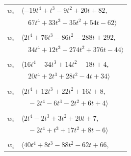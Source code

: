 \documentclass[11pt]{article}
\begin{document}
\begin{longtable}{@{}ll@{}}
$w_i$ & $\langle -19t^{4}+t^{3}-9t^{2}+20t+82,$\\
 & $\quad 67t^{4}+33t^{3}+35t^{2}+54t-62\rangle$\\
\addlinespace[2pt]
\multicolumn{2}{@{}p{0.97\textwidth}@{}}{$i=72$, $D_i=1$, $\rho_{ij}$: $5{:}1, \allowbreak 9{:}2, \allowbreak 10{:}2, \allowbreak 12{:}3, \allowbreak 28{:}3, \allowbreak 29{:}1, \allowbreak 57{:}1, \allowbreak 62{:}1, \allowbreak 63{:}3, \allowbreak 64{:}1, \allowbreak 65{:}3$}\\
$w_i$ & $\langle 2t^{4}+76t^{3}-86t^{2}-288t+292,$\\
 & $\quad 34t^{4}+12t^{3}-274t^{2}+376t-44\rangle$\\
\addlinespace[2pt]
\multicolumn{2}{@{}p{0.97\textwidth}@{}}{$i=73$, $D_i=1$, $\rho_{ij}$: $0{:}2, \allowbreak 2{:}2, \allowbreak 3{:}3, \allowbreak 4{:}2, \allowbreak 15{:}1, \allowbreak 19{:}2, \allowbreak 24{:}3, \allowbreak 26{:}1, \allowbreak 30{:}2, \allowbreak 32{:}1, \allowbreak 36{:}3, \allowbreak 42{:}3, \allowbreak 50{:}1, \allowbreak 55{:}2, \allowbreak 66{:}3, \allowbreak 77{:}1$}\\
$w_i$ & $\langle 16t^{4}-34t^{3}+14t^{2}-18t+4,$\\
 & $\quad 20t^{4}+2t^{3}+28t^{2}-4t+34\rangle$\\
\addlinespace[2pt]
\multicolumn{2}{@{}p{0.97\textwidth}@{}}{$i=74$, $D_i=1$, $\rho_{ij}$: $3{:}2, \allowbreak 38{:}1, \allowbreak 49{:}3, \allowbreak 51{:}1, \allowbreak 58{:}1, \allowbreak 66{:}3, \allowbreak 76{:}3, \allowbreak 77{:}2$}\\
$w_i$ & $\langle 2t^{4}+12t^{3}+22t^{2}+16t+8,$\\
 & $\quad -2t^{4}-6t^{3}-2t^{2}+6t+4\rangle$\\
\addlinespace[2pt]
\multicolumn{2}{@{}p{0.97\textwidth}@{}}{$i=75$, $D_i=1$, $\rho_{ij}$: $1{:}3, \allowbreak 2{:}1, \allowbreak 4{:}2, \allowbreak 7{:}3, \allowbreak 18{:}1, \allowbreak 27{:}1, \allowbreak 31{:}1, \allowbreak 32{:}3, \allowbreak 38{:}1$}\\
$w_i$ & $\langle 2t^{4}-2t^{3}+3t^{2}+20t+7,$\\
 & $\quad -2t^{4}+t^{3}+17t^{2}+8t-6\rangle$\\
\addlinespace[2pt]
\multicolumn{2}{@{}p{0.97\textwidth}@{}}{$i=76$, $D_i=1$, $\rho_{ij}$: $11{:}3, \allowbreak 18{:}3, \allowbreak 24{:}1, \allowbreak 27{:}3, \allowbreak 37{:}1, \allowbreak 44{:}2, \allowbreak 45{:}3, \allowbreak 55{:}1, \allowbreak 62{:}1, \allowbreak 65{:}2, \allowbreak 74{:}1$}\\
$w_i$ & $\langle 40t^{4}+8t^{3}-88t^{2}-62t+66,$\\

\end{longtable}
\end{document}
